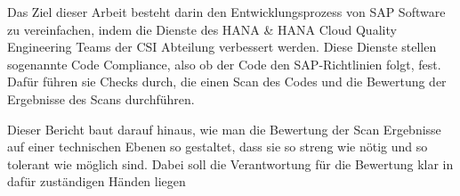 \documentclass[../main.tex]{subfiles}
\begin{document}
Das Ziel dieser Arbeit besteht darin den Entwicklungsprozess von SAP Software zu vereinfachen, indem die Dienste des HANA \& HANA Cloud Quality Engineering Teams der \gls{CSI} Abteilung verbessert werden.
Diese Dienste stellen sogenannte Code Compliance, also ob der Code den SAP-Richtlinien folgt, fest. Dafür führen sie Checks durch, die einen Scan des Codes und die Bewertung der Ergebnisse des Scans durchführen. 

Dieser Bericht baut darauf hinaus, wie man die Bewertung der Scan Ergebnisse auf einer technischen Ebenen so gestaltet, dass sie so streng wie nötig und so tolerant wie möglich sind.
Dabei soll die Verantwortung für die Bewertung klar in dafür zuständigen Händen liegen
\end{document}
